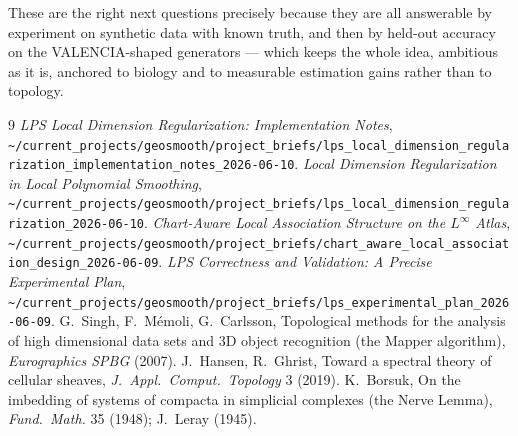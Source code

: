 \documentclass[11pt]{article}
\theoremstyle{definition}
\begin{document}
These are the right next questions precisely because they are all answerable by
experiment on synthetic data with known truth, and then by held-out accuracy on the
VALENCIA-shaped generators --- which keeps the whole idea, ambitious as it is,
anchored to biology and to measurable estimation gains rather than to topology.

\begin{thebibliography}{9}\small
{} \emph{LPS Local Dimension Regularization: Implementation Notes},
  \nolinkurl{~/current_projects/geosmooth/project_briefs/lps_local_dimension_regularization_implementation_notes_2026-06-10}.
 \emph{Local Dimension Regularization in Local Polynomial
  Smoothing}, \nolinkurl{~/current_projects/geosmooth/project_briefs/lps_local_dimension_regularization_2026-06-10}.
 \emph{Chart-Aware Local Association Structure on the
  $L^\infty$ Atlas},
  \nolinkurl{~/current_projects/geosmooth/project_briefs/chart_aware_local_association_design_2026-06-09}.
 \emph{LPS Correctness and Validation: A Precise Experimental Plan},
  \nolinkurl{~/current_projects/geosmooth/project_briefs/lps_experimental_plan_2026-06-09}.
 G.~Singh, F.~M\'emoli, G.~Carlsson, Topological methods for the
  analysis of high dimensional data sets and 3D object recognition (the Mapper
  algorithm), \emph{Eurographics SPBG} (2007).
 J.~Hansen, R.~Ghrist, Toward a spectral theory of cellular
  sheaves, \emph{J.\ Appl.\ Comput.\ Topology} 3 (2019).
 K.~Borsuk, On the imbedding of systems of compacta in simplicial
  complexes (the Nerve Lemma), \emph{Fund.\ Math.} 35 (1948); J.~Leray (1945).
\end{thebibliography}
\end{document}
